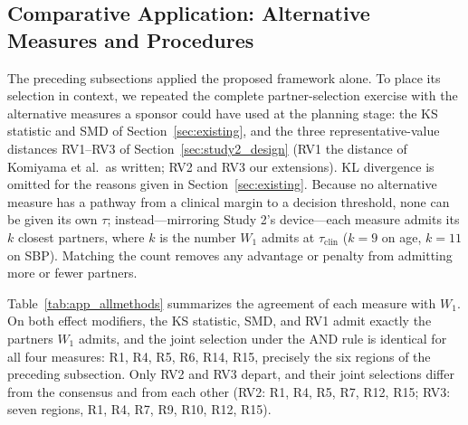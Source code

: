 \documentclass[AMA,Times1COL]{WileyNJDv5}
\begin{document}
\subsection{Comparative Application: Alternative Measures and Procedures}\label{sec:app_allmethods}

The preceding subsections applied the proposed framework alone. To place its selection in context, we repeated the complete partner-selection exercise with the alternative measures a sponsor could have used at the planning stage: the KS statistic and SMD of Section~\ref{sec:existing}, and the three representative-value distances RV1--RV3 of Section~\ref{sec:study2_design} (RV1 the distance of Komiyama et al.\ as written; RV2 and RV3 our extensions).\cite{komiyama2024} KL divergence is omitted for the reasons given in Section~\ref{sec:existing}. Because no alternative measure has a pathway from a clinical margin to a decision threshold, none can be given its own $\tau$; instead---mirroring Study 2's device---each measure admits its $k$ closest partners, where $k$ is the number $W_1$ admits at $\tau_{\text{clin}}$ ($k = 9$ on age, $k = 11$ on SBP). Matching the count removes any advantage or penalty from admitting more or fewer partners.

Table~\ref{tab:app_allmethods} summarizes the agreement of each measure with $W_1$. On both effect modifiers, the KS statistic, SMD, and RV1 admit exactly the partners $W_1$ admits, and the joint selection under the AND rule is identical for all four measures: R1, R4, R5, R6, R14, R15, precisely the six regions of the preceding subsection. Only RV2 and RV3 depart, and their joint selections differ from the consensus and from each other (RV2: R1, R4, R5, R7, R12, R15; RV3: seven regions, R1, R4, R7, R9, R10, R12, R15).
\end{document}
